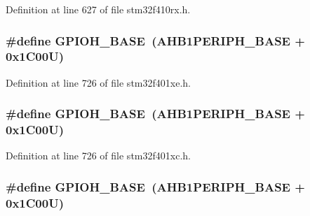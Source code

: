 Definition at line 627 of file stm32f410rx.\+h.

\subsubsection[{\texorpdfstring{G\+P\+I\+O\+H\+\_\+\+B\+A\+SE}{GPIOH_BASE}}]{\setlength{\rightskip}{0pt plus 5cm}\#define G\+P\+I\+O\+H\+\_\+\+B\+A\+SE~({\bf A\+H\+B1\+P\+E\+R\+I\+P\+H\+\_\+\+B\+A\+SE} + 0x1\+C00\+U)}\hypertarget{group___peripheral__registers__structures_gaee4716389f3a1c727495375b76645608}{}\label{group___peripheral__registers__structures_gaee4716389f3a1c727495375b76645608}


Definition at line 726 of file stm32f401xe.\+h.

\subsubsection[{\texorpdfstring{G\+P\+I\+O\+H\+\_\+\+B\+A\+SE}{GPIOH_BASE}}]{\setlength{\rightskip}{0pt plus 5cm}\#define G\+P\+I\+O\+H\+\_\+\+B\+A\+SE~({\bf A\+H\+B1\+P\+E\+R\+I\+P\+H\+\_\+\+B\+A\+SE} + 0x1\+C00\+U)}\hypertarget{group___peripheral__registers__structures_gaee4716389f3a1c727495375b76645608}{}\label{group___peripheral__registers__structures_gaee4716389f3a1c727495375b76645608}


Definition at line 726 of file stm32f401xc.\+h.

\subsubsection[{\texorpdfstring{G\+P\+I\+O\+H\+\_\+\+B\+A\+SE}{GPIOH_BASE}}]{\setlength{\rightskip}{0pt plus 5cm}\#define G\+P\+I\+O\+H\+\_\+\+B\+A\+SE~({\bf A\+H\+B1\+P\+E\+R\+I\+P\+H\+\_\+\+B\+A\+SE} + 0x1\+C00\+U)}\hypertarget{group___peripheral__registers__structures_gaee4716389f3a1c727495375b76645608}{}\label{group___peripheral__registers__structures_gaee4716389f3a1c727495375b76645608}


